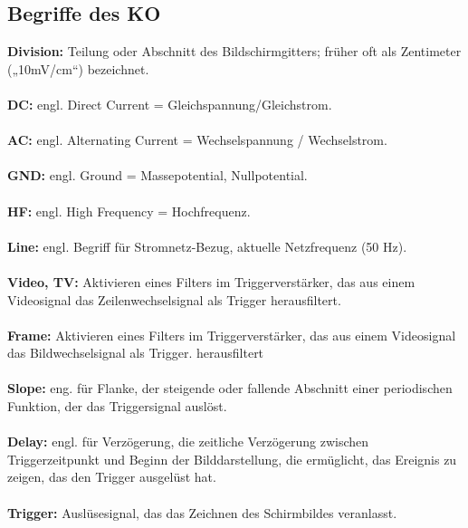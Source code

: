 \subsection{Begriffe des KO}
\textbf{Division:} Teilung oder Abschnitt des Bildschirmgitters; früher oft als Zentimeter („10mV/cm“) bezeichnet.
\\\\
\textbf{DC:} engl. Direct Current = Gleichspannung/Gleichstrom.
\\\\
\textbf{AC:} engl. Alternating Current = Wechselspannung / Wechselstrom.
\\\\
\textbf{GND:} engl. Ground = Massepotential, Nullpotential.
\\\\
\textbf{HF:} engl. High Frequency = Hochfrequenz.
\\\\
\textbf{Line:} engl. Begriff für Stromnetz-Bezug, aktuelle Netzfrequenz (50 Hz).
\\\\
\textbf{Video, TV:} Aktivieren eines Filters im Triggerverstärker, das aus einem Videosignal das Zeilenwechselsignal als Trigger herausfiltert.
\\\\
\textbf{Frame:} Aktivieren eines Filters im Triggerverstärker, das aus einem Videosignal das Bildwechselsignal als Trigger. herausfiltert
\\\\
\textbf{Slope:} eng. für Flanke, der steigende oder fallende Abschnitt einer periodischen Funktion, der das Triggersignal auslöst.
\\\\
\textbf{Delay:} engl. für Verzögerung, die zeitliche Verzögerung zwischen Triggerzeitpunkt und Beginn der Bilddarstellung, die ermüglicht, das Ereignis zu zeigen, das den Trigger ausgelüst hat.
\\\\
\textbf{Trigger:} Auslüsesignal, das das Zeichnen des Schirmbildes veranlasst.
